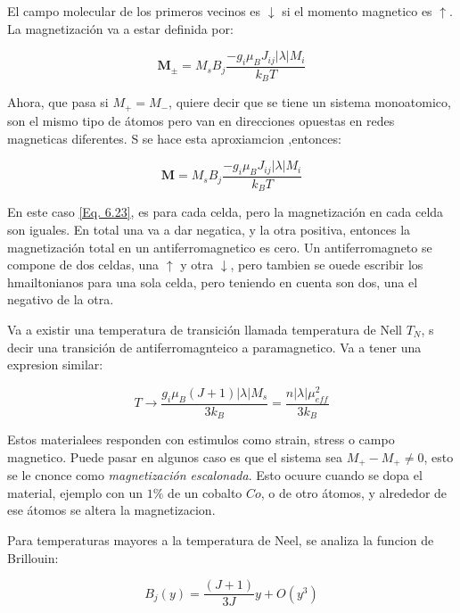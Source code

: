\documentclass[11pt,fleqn]{book}
\renewcommand{\vec}[1]{\mathbf{#1}}
\begin{document}
El campo molecular de los primeros vecinos es $\downarrow$ si el momento magnetico es $\uparrow$. La magnetización va a estar definida por:

\begin{equation}
    \vec{M}_{\pm}=M_{s}B_{j}\frac{-g_{i}\mu_{B}J_{ij}|\lambda|M_{i}}{k_{B}T}
    \label{Eq. 6.22}
\end{equation}

Ahora, que pasa si $M_{+}=M_{-}$, quiere decir que se tiene un sistema monoatomico, son el mismo tipo de átomos pero van en direcciones opuestas en redes magneticas diferentes. S se hace esta aproxiamcion ,entonces:

\begin{equation}
    \vec{M}=M_{s}B_{j}\frac{-g_{i}\mu_{B}J_{ij}|\lambda|M_{i}}{k_{B}T}
    \label{Eq. 6.23}
\end{equation}

En este caso \ref{Eq. 6.23}, es para cada celda, pero la magnetización en cada celda son iguales. En total una va a dar negatica, y la otra positiva, entonces la magnetización total en un antiferromagnetico es cero. Un antiferromagneto se compone de dos celdas, una $\uparrow$ y otra $\downarrow$, pero tambien se ouede escribir los hmailtonianos para una sola celda, pero teniendo en cuenta son dos, una el negativo de la otra.

Va a existir una temperatura de transición llamada temperatura de Nell $T_{N}$, s decir una transición de antiferromagnteico a paramagnetico. Va a tener una expresion similar:

\begin{equation*}
    T\longrightarrow\frac{g_{i}\mu_{B}(J+1)|\lambda|M_{s}}{3k_{B}}=\frac{n|\lambda|\mu_{eff}^{2}}{3k_{B}}
\end{equation*}

Estos materialees responden con estimulos como strain, stress o campo magnetico. Puede pasar en algunos caso es que el sistema sea $M_{+}-M_{+}\neq0$, esto se le cnonce como \emph{magnetización escalonada}. Esto ocuure cuando se dopa el material, ejemplo con un $1\%$ de un cobalto $Co$, o de otro átomos, y alrededor de ese átomos se altera la magnetizacion. 

Para temperaturas mayores a la temperatura de Neel, se analiza la funcion de Brillouin:

\begin{equation*}
    B_{j}(y)=\frac{(J+1)}{3J}y+ O(y^{3})
\end{equation*}
\end{document}
